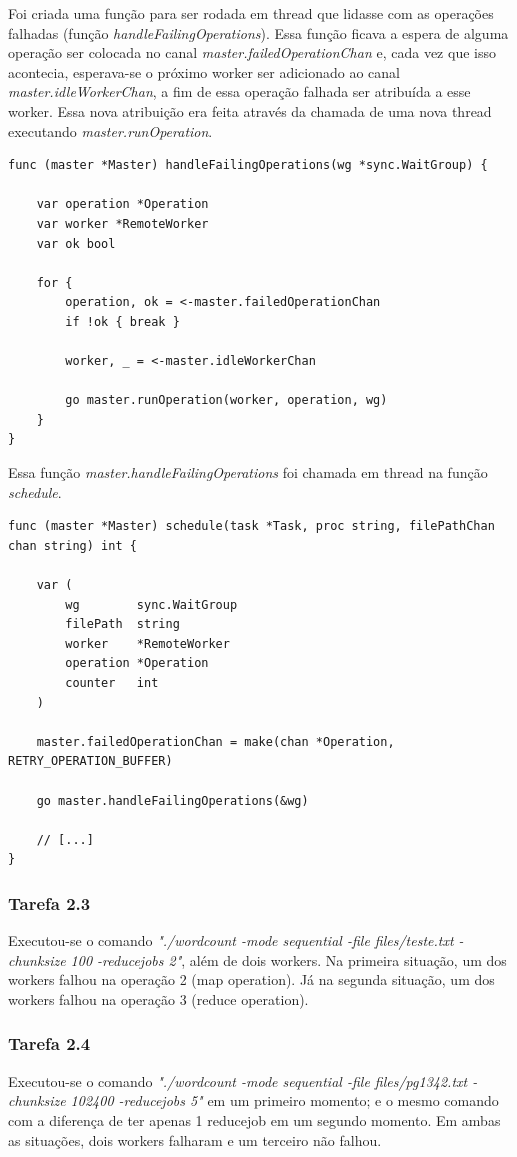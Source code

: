 \documentclass[conference]{IEEEtran}
\begin{document}
Foi criada uma função para ser rodada em thread que lidasse com as operações falhadas (função \textit{handleFailingOperations}). Essa função ficava a espera de alguma operação ser colocada no canal \textit{master.failedOperationChan} e, cada vez que isso acontecia, esperava-se o próximo worker ser adicionado ao canal \textit{master.idleWorkerChan}, a fim de essa operação falhada ser atribuída a esse worker. Essa nova atribuição era feita através da chamada de uma nova thread executando \textit{master.runOperation}.

\begin{lstlisting}
func (master *Master) handleFailingOperations(wg *sync.WaitGroup) {

	var operation *Operation
	var worker *RemoteWorker
	var ok bool

	for {
		operation, ok = <-master.failedOperationChan
		if !ok { break }

		worker, _ = <-master.idleWorkerChan

		go master.runOperation(worker, operation, wg)
	}
}
\end{lstlisting}

Essa função \textit{master.handleFailingOperations} foi chamada em thread na função \textit{schedule}.

\begin{lstlisting}
func (master *Master) schedule(task *Task, proc string, filePathChan chan string) int {

	var (
		wg        sync.WaitGroup
		filePath  string
		worker    *RemoteWorker
		operation *Operation
		counter   int
	)
	
	master.failedOperationChan = make(chan *Operation, RETRY_OPERATION_BUFFER)

	go master.handleFailingOperations(&wg)

	// [...]
}
\end{lstlisting}

\subsubsection{Tarefa 2.3} Executou-se o comando \textit{"./wordcount -mode sequential -file files/teste.txt -chunksize 100 -reducejobs 2"}, além de dois workers. Na primeira situação, um dos workers falhou na operação 2 (map operation). Já na segunda situação, um dos workers falhou na operação 3 (reduce operation).

\subsubsection{Tarefa 2.4} Executou-se o comando \textit{"./wordcount -mode sequential -file files/pg1342.txt -chunksize 102400 -reducejobs 5"} em um primeiro momento; e o mesmo comando com a diferença de ter apenas 1 reducejob em um segundo momento. Em ambas as situações, dois workers falharam e um terceiro não falhou.
\end{document}
